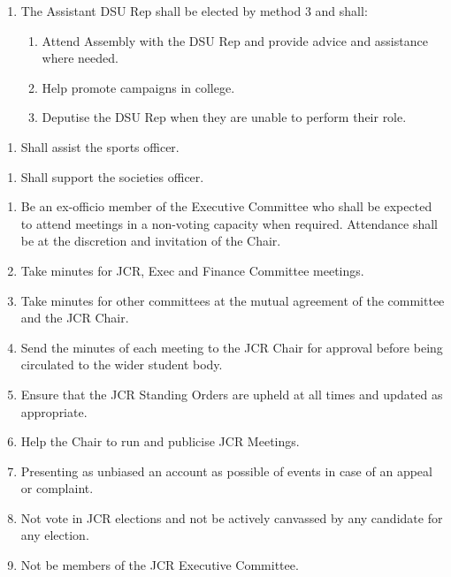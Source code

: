 \label{Assistant DSU Rep}
\begin{enumerate}
    \item The Assistant DSU Rep shall be elected by method 3 and shall:
    \begin{enumerate}
        \item Attend Assembly with the DSU Rep and provide advice and assistance where needed. 
        \item Help promote campaigns in college.
        \item Deputise the DSU Rep when they are unable to perform their role.
    \end{enumerate}
\end{enumerate}

\begin{enumerate}
    \item Shall assist the sports officer.
\end{enumerate}

\begin{enumerate}
    \item Shall support the societies officer.
\end{enumerate}

\begin{enumerate}
    \item Be an ex-officio member of the Executive Committee who shall be expected to attend meetings in a non-voting capacity when required. Attendance shall be at the discretion and invitation of the Chair.
    \item Take minutes for JCR, Exec and Finance Committee meetings.
    \item Take minutes for other committees at the mutual agreement of the committee and the JCR Chair.
    \item Send the minutes of each meeting to the JCR Chair for approval before being circulated to the wider student body. 
    \item Ensure that the JCR Standing Orders are upheld at all times and updated as appropriate. 
    \item Help the Chair to run and publicise JCR Meetings.
    \item Presenting as unbiased an account as possible of events in case of an appeal or complaint.
    \item Not vote in JCR elections and not be actively canvassed by any candidate for any election. 
    \item Not be members of the JCR Executive Committee.
\end{enumerate}

